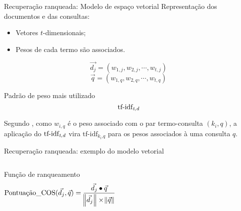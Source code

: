 \documentclass[%
  10pt,%
  aspectratio = 169,%
  compress,%
  t,%
]{beamer}%
\begin{document}
    \begin{frame}[fragile = singleslide]{}{Recuperação ranqueada: Modelo de espaço vetorial}
        Representação dos documentos e das consultas:
        \begin{itemize}
            \item Vetores $t$-dimensionais;
            \item Pesos de cada termo são associados.
        \end{itemize}
        \begin{equation}
            \label{eq:vetor-pesos-documento}
    		\vec{d_j} = (w_{1,j}, w_{2,j}, \cdots , w_{t,j})
        \end{equation}
        \begin{equation}
            \label{eq:vetor-pesos-consulta}
    		\vec{q} = (w_{1,q}, w_{2,q}, \cdots , w_{t,q})
        \end{equation}
        
        \begin{block}{Padrão de peso mais utilizado}
            \begin{equation}
                \text{tf-idf}_{\text{\textit{t},\textit{d}}}
            \end{equation}
            
            Segundo \cite[p.~77--78]{Baeza-Yates2011}, como $w_{i,q}$ é o peso associado com o par termo-consulta $(k_i, q)$, a aplicação do $\text{tf-idf}_{\text{\textit{t},\textit{d}}}$ vira $\text{tf-idf}_{k_i\text{,}\textit{q}}$ para os pesos associados à uma consulta $q$.
        \end{block}
    \end{frame}
    
    
    \begin{frame}[fragile = singleslide]{}{Recuperação ranqueada: exemplo do modelo vetorial}
        \begin{columns}[t]
            
            
            \vspace{1cm}
            \begin{block}{Função de ranqueamento}
            \begin{equation}
                \label{eq:pontuação-similaridade-cosseno}
        		\text{Pontuação\_COS}(\vec{d_j}, \vec{q}) = \frac{\vec{d_j} \bullet \vec{q} }{ \norm{\vec{d_j}} \times \norm{\vec{q}} }
            \end{equation}
            \end{block}
            \vspace{1cm}

        \end{columns}
    \end{frame}
    
\end{document}
